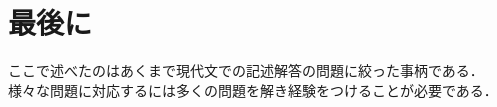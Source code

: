 \documentclass{tarticle}
\begin{document}
	\section*{最後に}
	ここで述べたのはあくまで現代文での記述解答の問題に絞った事柄である．
	様々な問題に対応するには多くの問題を解き経験をつけることが必要である．
\end{document}

